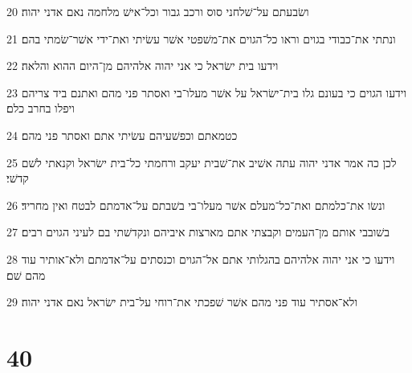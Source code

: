 \par 20 ושׂבעתם על־שׁלחני סוס ורכב גבור וכל־אישׁ מלחמה נאם אדני יהוה׃
\par 21 ונתתי את־כבודי בגוים וראו כל־הגוים את־משׁפטי אשׁר עשׂיתי ואת־ידי אשׁר־שׂמתי בהם׃
\par 22 וידעו בית ישׂראל כי אני יהוה אלהיהם מן־היום ההוא והלאה׃
\par 23 וידעו הגוים כי בעונם גלו בית־ישׂראל על אשׁר מעלו־בי ואסתר פני מהם ואתנם ביד צריהם ויפלו בחרב כלם׃
\par 24 כטמאתם וכפשׁעיהם עשׂיתי אתם ואסתר פני מהם׃
\par 25 לכן כה אמר אדני יהוה עתה אשׁיב את־שׁבית יעקב ורחמתי כל־בית ישׂראל וקנאתי לשׁם קדשׁי׃
\par 26 ונשׂו את־כלמתם ואת־כל־מעלם אשׁר מעלו־בי בשׁבתם על־אדמתם לבטח ואין מחריד׃
\par 27 בשׁובבי אותם מן־העמים וקבצתי אתם מארצות איביהם ונקדשׁתי בם לעיני הגוים רבים׃
\par 28 וידעו כי אני יהוה אלהיהם בהגלותי אתם אל־הגוים וכנסתים על־אדמתם ולא־אותיר עוד מהם שׁם׃
\par 29 ולא־אסתיר עוד פני מהם אשׁר שׁפכתי את־רוחי על־בית ישׂראל נאם אדני יהוה׃

\chapter{40}

